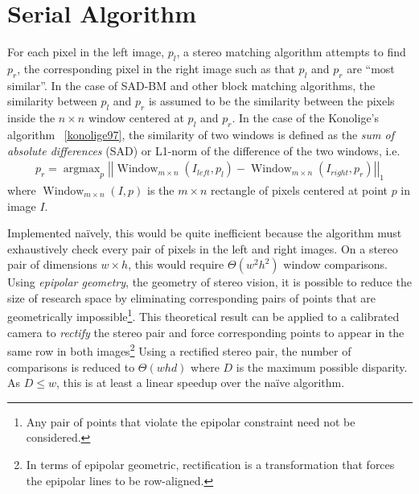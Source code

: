 \documentclass{article}
\DeclareMathOperator*{\argmax}{argmax}
\DeclareMathOperator{\Window}{Window}
\begin{document}
\section{Serial Algorithm}
\label{sec:serial}
For each pixel in the left image, $p_l$, a stereo matching algorithm attempts
to find $p_r$, the corresponding pixel in the right image such as that $p_l$
and $p_r$ are ``most similar''. In the case of SAD-BM and other block matching
algorithms, the similarity between $p_l$ and $p_r$ is assumed to be the
similarity between the pixels inside the $n \times n$ window centered at $p_l$
and $p_r$. In the case of the Konolige's algorithm ~\ref{konolige97}, the
similarity of two windows is defined as the \textit{sum of absolute
differences} (SAD) or L1-norm of the difference of the two windows, i.e.
\begin{align*}
    p_r = \argmax_p \left|\left|\Window_{m \times n}(I_{left}, p_l)
          - \Window_{m \times n}(I_{right}, p_r)\right|\right|_1
\end{align*}
where $\Window_{m \times n}(I, p)$ is the $m \times n$ rectangle of pixels
centered at point $p$ in image $I$.

Implemented na\"{i}vely, this would be quite inefficient because the algorithm
must exhaustively check every pair of pixels in the left and right images. On a
stereo pair of dimensions $w \times h$, this would require $\Theta(w^2 h^2)$
window comparisons. Using \textit{epipolar geometry}, the geometry of stereo
vision, it is possible to reduce the size of research space by eliminating
corresponding pairs of points that are geometrically impossible\footnote{Any
pair of points that violate the epipolar constraint need not be considered.}.
This theoretical result can be applied to a calibrated camera to
\textit{rectify} the stereo pair and force corresponding points to appear in
the same row in both images\footnote{In terms of epipolar geometric,
rectification is a transformation that forces the epipolar lines to be
row-aligned.} Using a rectified stereo pair, the number of comparisons is
reduced to $\Theta(w h d)$ where $D$ is the maximum possible disparity. As
$D \le w$, this is at least a linear speedup over the na\"{i}ve algorithm.
\end{document}
